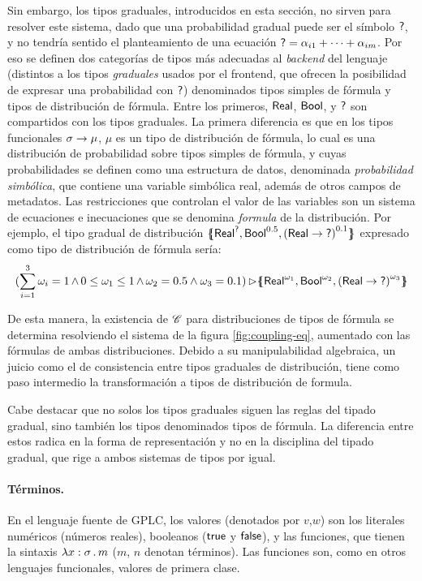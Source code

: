 Sin embargo, los tipos graduales, introducidos en esta sección, no sirven para resolver este sistema, dado que una probabilidad gradual puede ser el símbolo $\mathord{\text{\sffamily ?}}$, y no tendría sentido el planteamiento de una ecuación $\mathord{\text{\sffamily ?}} = \alpha_{i1} + \cdots + \alpha_{im}$. Por eso se definen dos categorías de tipos más adecuadas al \emph{backend} del lenguaje (distintos a los tipos \emph{graduales} usados por el frontend, que ofrecen la posibilidad de expresar una probabilidad con $\mathord{\text{\sffamily ?}}$) denominados tipos simples de fórmula y tipos de distribución de fórmula. Entre los primeros, $\mathord{\text{\sffamily Real}}$, $\mathord{\text{\sffamily Bool}}$, y $\mathord{\text{\sffamily ?}}$ son compartidos con los tipos graduales. La primera diferencia es que en los tipos funcionales $\sigma \to \mu$, $\mu$ es un tipo de distribución de fórmula, lo cual es una distribución de probabilidad sobre tipos simples de fórmula, y cuyas probabilidades se definen como una estructura de datos, denominada \emph{probabilidad simbólica}, que contiene una variable simbólica real, además de otros campos de metadatos. Las restricciones que controlan el valor de las variables son un sistema de ecuaciones e inecuaciones que se denomina \emph{formula} de la distribución. Por ejemplo, el tipo gradual de distribución $\{\mskip-7mu\{ {\mathord{\text{\sffamily Real}}^{\mathord{\text{\sffamily ?}}} , \mathord{\text{\sffamily Bool}}^{0.5}, {(\mathord{\text{\sffamily Real}} \to \mathord{\text{\sffamily ?}})}^{0.1}} \}\mskip-7mu\}$ expresado como tipo de distribución de fórmula sería:
\begin{equation*}
  \label{eq:form}
  (\sum_{i=1}^{3}\omega_i=1
  \mathop{\land}
  0\leq\omega_1\leq 1 \mathop{\land} \omega_2 = 0.5 \land \omega_3 = 0.1)
  \mathop{\rhd} \{\mskip-7mu\{ {\mathord{\text{\sffamily Real}} ^ {\omega_1}, \mathord{\text{\sffamily Bool}}^{\omega_2}, {(\mathord{\text{\sffamily Real}} \to \mathord{\text{\sffamily ?}})}^{\omega_3}} \}\mskip-7mu\}  
\end{equation*}


De esta manera, la existencia de $\mathscr{C}$ para distribuciones de
tipos de fórmula se determina resolviendo el sistema de la figura
\ref{fig:coupling-eq}, aumentado con las fórmulas de ambas
distribuciones. Debido a su manipulabilidad algebraica, un juicio como
el de consistencia entre tipos graduales de distribución, tiene como
paso intermedio la transformación a tipos de distribución de formula.

Cabe destacar que no solos los tipos graduales siguen las reglas del
tipado gradual, sino también los tipos denominados tipos de
fórmula. La diferencia entre estos radica en la forma de
representación y no en la disciplina del tipado gradual, que rige a
ambos sistemas de tipos por igual.



\paragraph{Términos.}\label{par:source-term} En el lenguaje fuente de
GPLC, los valores (denotados por $v$,$w$) son los literales numéricos
(números reales), booleanos ($\mathord{\text{\sffamily true}}$ y $\mathord{\text{\sffamily false}}$), y las funciones, que
tienen la sintaxis $\lambda {x} : {\sigma} \,.\, {m}$ ($m$, $n$ denotan
términos). Las funciones son, como en otros lenguajes funcionales,
valores de primera clase.



